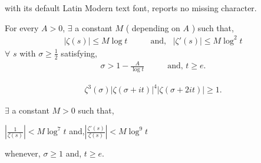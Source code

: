 \documentclass[10pt,a4paper]{amsart}
\begin{document}
with its default Latin Modern text font, reports no missing character.
	\begin{thm}\label{thm11}
		For every $A>0$, $\exists$ a constant $M$ ( depending on $A$ ) such that,
		\begin{eqnarray}\label{18}
			|\zeta(s)|\leq M\log t \hspace{20pt} &\mbox{ and,}\hspace{10pt}  |\zeta'(s)|\leq M\log^{2} t
		\end{eqnarray}
		$\forall$ $s$ with $\sigma \geq \frac{1}{2}$ satisfying,
		\begin{eqnarray}\label{19}
			\sigma>1-\frac{A}{\log t } \hspace{20pt} &\mbox{ and, }  t\geq e .
		\end{eqnarray}
	\end{thm}

		\begin{eqnarray}\label{20}
			\zeta^{3}(\sigma)|\zeta(\sigma+it)|^{4}|\zeta(\sigma+2it)|\geq 1.
		\end{eqnarray}

	\begin{thm}\label{thm15}
		$\exists$ a constant $M>0$ such that,
		\begin{center}
			$|\frac{1}{\zeta(s)}|<M\log^{7}t$ \hspace{10pt}and,\hspace{10pt}$|\frac{\zeta'(s)}{\zeta(s)}|<M\log^{9}t$  
		\end{center}
		whenever, $\sigma\geq 1$ and,  $t\geq e$.
	\end{thm}
\end{document}
